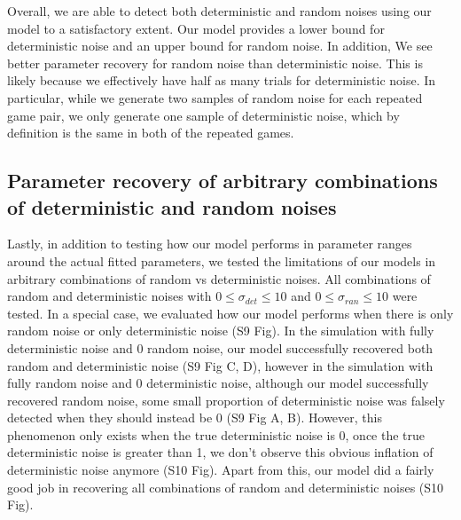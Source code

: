 \documentclass[12pt]{article}
\newcommand{\bcaption}[2]{\caption[#1]{\textbf{#1} #2}}
\renewcommand{\includegraphics}[2][]{}
\renewcommand{\caption}[1]{}
\begin{document}
	Overall, we are able to detect both deterministic and random noises using our model to a satisfactory extent. Our model provides a lower bound for deterministic noise and an upper bound for random noise. In addition, We see better parameter recovery for random noise than deterministic noise. This is likely because we effectively have half as many trials for deterministic noise. In particular, while we generate two samples of random noise for each repeated game pair, we only generate one sample of deterministic noise, which by definition is the same in both of the repeated games. 
	
%
%	
	\newpage	
	\subsection{Parameter recovery of arbitrary combinations of deterministic and random noises \label{gridrecovery}}
	
	Lastly, in addition to testing how our model performs in parameter ranges around the actual fitted parameters, we tested the limitations of our models in arbitrary combinations of random vs deterministic noises. All combinations of random and deterministic noises with $0 \le \sigma_{det} \le 10$ and $0 \le \sigma_{ran} \le 10$ were tested. In a special case, we evaluated how our model performs when there is only random noise or only deterministic noise (S9 Fig). In the simulation with fully deterministic noise and 0 random noise, our model successfully recovered both random and deterministic noise (S9 Fig C, D), however in the simulation with fully random noise and 0 deterministic noise, although our model successfully recovered random noise, some small proportion of deterministic noise was falsely detected when they should instead be 0 (S9 Fig A, B). However, this phenomenon only exists when the true deterministic noise is 0, once the true deterministic noise is greater than 1, we don't observe this obvious inflation of deterministic noise anymore (S10 Fig). Apart from this, our model did a fairly good job in recovering all combinations of random and deterministic noises (S10 Fig).
	
\end{document}
